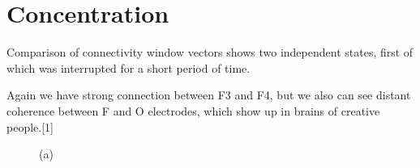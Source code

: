 \vspace*{4cm}







\section{Concentration}
\par Comparison of connectivity window vectors shows two independent states, first of which was interrupted for a short period of time.
\par Again we have strong connection between F3 and F4, but we also can see distant coherence between F and O electrodes, which show up in brains of creative people.[1] 

\begin{figure}[h!]
\begin{minipage}[h]{0.49\linewidth}
 (a) \\
\end{minipage}
\hfill
\begin{minipage}[h]{0.5\linewidth}

\end{minipage}
\end{figure}
